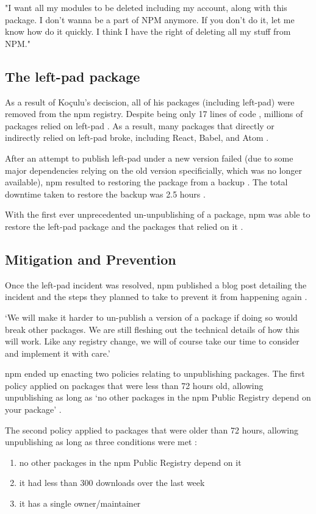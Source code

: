 \documentclass[acmsmall]{acmart}
\begin{document}
"I want all my modules to be deleted including my account, along with this
package. I don't wanna be a part of NPM anymore. If you don't do it, let me know
how do it quickly. I think I have the right of deleting all my stuff from NPM."
\cite{medium-mikeroberts}

\subsection{The left-pad package}
As a result of Koçulu's deciscion, all of his packages (including left-pad) were
removed from the npm registry. Despite being only 17 lines of code
\cite{github-leftpad-code}, millions of packages relied on left-pad
\cite{github-leftpad-dependency}. As a result, many packages that directly or
indirectly relied on left-pad broke, including React, Babel, and Atom
\cite{npmblog-leftpad}.

After an attempt to publish left-pad under a new version failed (due to some
major dependencies relying on the old version specificially, which was no longer
available), npm resulted to restoring the package from a backup
\cite{npmblog-leftpad}. The total downtime taken to restore the backup was 2.5
hours \cite{npmblog-leftpad}.

With the first ever unprecedented un-unpublishing of a package, npm was able to
restore the left-pad package and the packages that relied on it
\cite{npmblog-leftpad}.

\subsection{Mitigation and Prevention}
Once the left-pad incident was resolved, npm published a blog post detailing the
incident and the steps they planned to take to prevent it from happening again
\cite{npmblog-leftpad}.

`We will make it harder to un-publish a version of a package if doing so would
break other packages. We are still fleshing out the technical details of how
this will work. Like any registry change, we will of course take our time to
consider and implement it with care.' \cite{npmblog-leftpad}

npm ended up enacting two policies relating to unpublishing packages. The first
policy applied on packages that were less than 72 hours old, allowing
unpublishing as long as `no other packages in the npm Public Registry depend on
your package' \cite{npm-docs-unpublishing}.

The second policy applied to packages that were older than 72 hours, allowing
unpublishing as long as three conditions were met \cite{npm-docs-unpublishing}:
\begin{enumerate}
  \item no other packages in the npm Public Registry depend on it
  \item it had less than 300 downloads over the last week
  \item it has a single owner/maintainer
\end{enumerate}
\end{document}
